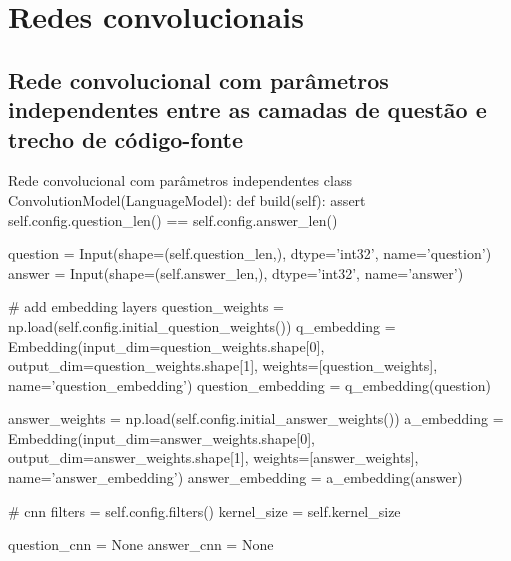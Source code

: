 \section{Redes convolucionais}

\subsection{Rede convolucional com parâmetros independentes entre as camadas de questão e trecho de código-fonte}

\begin{mypython-linenumber}{Rede convolucional com parâmetros independentes}
class ConvolutionModel(LanguageModel):
    def build(self):
        assert self.config.question_len() == self.config.answer_len()

        question = Input(shape=(self.question_len,), dtype='int32', name='question')
        answer = Input(shape=(self.answer_len,), dtype='int32', name='answer')

        # add embedding layers
        question_weights = np.load(self.config.initial_question_weights())
        q_embedding = Embedding(input_dim=question_weights.shape[0],
                                output_dim=question_weights.shape[1],
                                weights=[question_weights],
                                name='question_embedding')
        question_embedding = q_embedding(question)

        answer_weights = np.load(self.config.initial_answer_weights())
        a_embedding = Embedding(input_dim=answer_weights.shape[0],
                                output_dim=answer_weights.shape[1],
                                weights=[answer_weights],
                                name='answer_embedding')
        answer_embedding = a_embedding(answer)

        # cnn
        filters = self.config.filters()
        kernel_size = self.kernel_size

        question_cnn = None
        answer_cnn = None


\end{mypython-linenumber}
